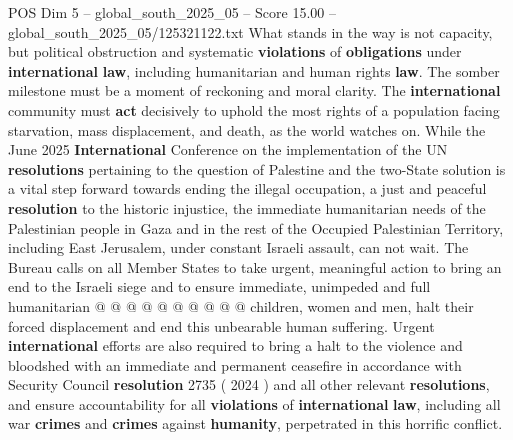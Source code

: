 \begin{textsample}{POS Dim 5 – global\_south\_2025\_05 – Score 15.00 – global\_south\_2025\_05/125321122.txt}
What stands in the way is not capacity, but political obstruction and systematic \textbf{violations} of \textbf{obligations} under \textbf{international} \textbf{law}, including humanitarian and human rights \textbf{law}.
The somber milestone must be a moment of reckoning and moral clarity.
The \textbf{international} community must \textbf{act} decisively to uphold the most rights of a population facing starvation, mass displacement, and death, as the world watches on.
While the June 2025 \textbf{International} Conference on the implementation of the UN \textbf{resolutions} pertaining to the question of Palestine and the two-State solution is a vital step forward towards ending the illegal occupation, a just and peaceful \textbf{resolution} to the historic injustice, the immediate humanitarian needs of the Palestinian people in Gaza and in the rest of the Occupied Palestinian Territory, including East Jerusalem, under constant Israeli assault, can not wait.
The Bureau calls on all Member States to take urgent, meaningful action to bring an end to the Israeli siege and to ensure immediate, unimpeded and full humanitarian @ @ @ @ @ @ @ @ @ @ children, women and men, halt their forced displacement and end this unbearable human suffering.
Urgent \textbf{international} efforts are also required to bring a halt to the violence and bloodshed with an immediate and permanent ceasefire in accordance with Security Council \textbf{resolution} 2735 ( 2024 ) and all other relevant \textbf{resolutions}, and ensure accountability for all \textbf{violations} of \textbf{international} \textbf{law}, including all war \textbf{crimes} and \textbf{crimes} against \textbf{humanity}, perpetrated in this horrific conflict.

\end{textsample}
